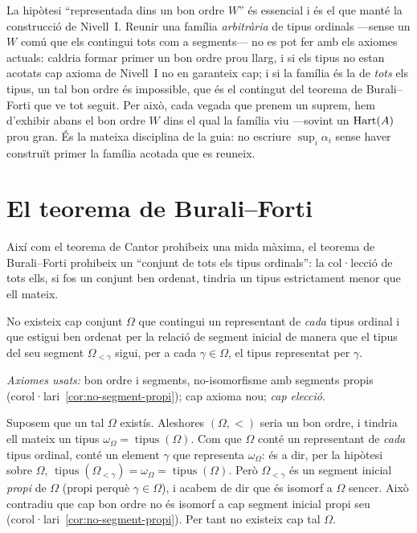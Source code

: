 \begin{observacio}\label{obs:suprem-acotat}
La hipòtesi \enquote{representada dins un bon ordre \(W\)} és essencial i és el
que manté la construcció de Nivell~I. Reunir una família \emph{arbitrària} de
tipus ordinals ---sense un \(W\) comú que els contingui tots com a segments---
no es pot fer amb els axiomes actuals: caldria formar primer un bon ordre prou
llarg, i si els tipus no estan acotats cap axioma de Nivell~I no en garanteix
cap; i si la família és la de \emph{tots} els tipus, un tal bon ordre és
impossible, que és el contingut del teorema de Burali--Forti que ve tot
seguit. Per això, cada vegada que prenem un suprem, hem d'exhibir abans el bon
ordre \(W\) dins el qual la família viu ---sovint un \(\operatorname{Hart}(A)\) prou gran. És
la mateixa disciplina de la guia: no escriure \(\sup_i\alpha_i\) sense haver
construït primer la família acotada que es reuneix.
\end{observacio}

\section{El teorema de Burali--Forti}\label{sec:burali-forti}

Així com el teorema de Cantor prohibeix una mida màxima, el teorema de
Burali--Forti prohibeix un \enquote{conjunt de tots els tipus ordinals}: la
col·lecció de tots ells, si fos un conjunt ben ordenat, tindria un tipus
estrictament menor que ell mateix.

\begin{teorema}\label{teo:burali-forti}
No existeix cap conjunt \(\Omega\) que contingui un representant de
\emph{cada} tipus ordinal i que estigui ben ordenat per la relació de segment
inicial de manera que el tipus del seu segment \(\Omega_{<\gamma}\) sigui,
per a cada \(\gamma\in\Omega\), el tipus representat per \(\gamma\).\par
\emph{Axiomes usats:} bon ordre i segments, no-isomorfisme amb segments propis
(corol·lari~\ref{cor:no-segment-propi}); cap axioma nou; \emph{cap elecció}.
\end{teorema}

\begin{prova}
Suposem que un tal \(\Omega\) existís. Aleshores \((\Omega,<)\) seria un bon
ordre, i tindria ell mateix un tipus \(\omega_\Omega=\operatorname{tipus}(\Omega)\).
Com que \(\Omega\) conté un representant de \emph{cada} tipus ordinal, conté un
element \(\gamma\) que representa \(\omega_\Omega\): és a dir, per la hipòtesi
sobre \(\Omega\), \(\operatorname{tipus}(\Omega_{<\gamma})=\omega_\Omega=\operatorname{tipus}(\Omega)\).
Però \(\Omega_{<\gamma}\) és un segment inicial \emph{propi} de \(\Omega\)
(propi perquè \(\gamma\in\Omega\)), i acabem de dir que és isomorf a \(\Omega\)
sencer. Això contradiu que cap bon ordre no és isomorf a cap segment inicial
propi seu (corol·lari~\ref{cor:no-segment-propi}). Per tant no existeix cap tal
\(\Omega\).
\end{prova}

